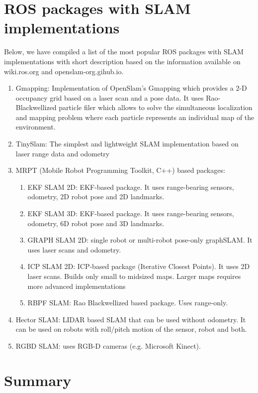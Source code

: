 \documentclass[twoside]{article}
\begin{document}
\section{ROS packages with SLAM implementations}
Below, we have compiled a list of the most popular ROS packages with SLAM implementations with short description based on the information available on wiki.ros.org and openslam-org.gihub.io.
\begin{enumerate}
    \item Gmapping: Implementation of OpenSlam's Gmapping which provides a 2-D occupancy grid based on a laser scan and a pose data. It uses Rao-Blackwellized particle filer which allows to solve the simultaneous localization and mapping problem where each particle represents an individual map of the environment.
    \item TinySlam: The simplest and lightweight SLAM implementation based on laser range data and odometry
    \item MRPT (Mobile Robot Programming Toolkit, C++) based packages:
    \begin{enumerate}
        \item EKF SLAM 2D: EKF-based package. It uses range-bearing sensors, odometry, 2D robot pose and 2D landmarks.
        \item EKF SLAM 3D: EKF-based package. It uses range-bearing sensors, odometry, 6D robot pose and 3D landmarks.
        \item GRAPH SLAM 2D: single robot or multi-robot pose-only graphSLAM. It uses laser scans and odometry.
        \item ICP SLAM 2D: ICP-based package (Iterative Closest Points). It uses 2D laser scans. Builds only small to midsized maps. Larger maps requires more advanced implementations
        \item RBPF SLAM: Rao Blackwellized based package. Uses range-only.
    \end{enumerate}
    \item Hector SLAM: LIDAR based SLAM that can be used without odometry. It can be used on robots with roll/pitch motion of the sensor, robot and both.
    \item RGBD SLAM: uses RGB-D cameras (e.g. Microsoft Kinect).
\end{enumerate}

\section {Summary}
\end{document}
